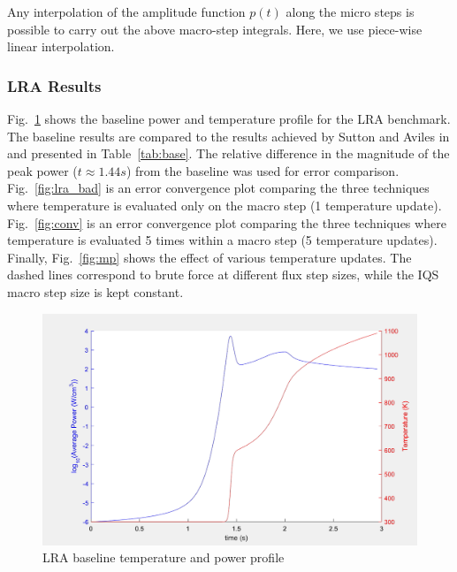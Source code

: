 \documentclass{anstrans}
\newcommand{\fig}[1]{Fig.~\ref{#1}}                      %
\newcommand{\tbl}[1]{Table~\ref{#1}}                     %
\begin{document}
Any interpolation of the amplitude function $p(t)$ along the micro steps is possible to carry out the above macro-step integrals. Here, we use piece-wise linear interpolation.

\subsubsection{LRA Results}

\fig{fig:lra_profile} shows the baseline power and temperature profile for the LRA benchmark.  The baseline results are compared to the results achieved by Sutton and Aviles in \cite{Sutton_1996} and presented in \tbl{tab:base}.  The relative difference in the magnitude of the peak power ($t\approx1.44 s$) from the baseline was used for error comparison.  \fig{fig:lra_bad} is an error convergence plot comparing the three techniques where temperature is evaluated only on the macro step (1 temperature update).  \fig{fig:conv} is an error convergence plot comparing the three techniques where temperature is evaluated 5 times within a macro step (5 temperature updates).  Finally, \fig{fig:mp} shows the effect of various temperature updates. The dashed lines correspond to brute force at different flux step sizes, while the IQS macro step size is kept constant. \\

\begin{figure}[htbp!]
\centering
\includegraphics[width=\linewidth]{lra_profile.png}
\caption{LRA baseline temperature and power profile}
\label{fig:lra_profile}
\end{figure}
\end{document}
